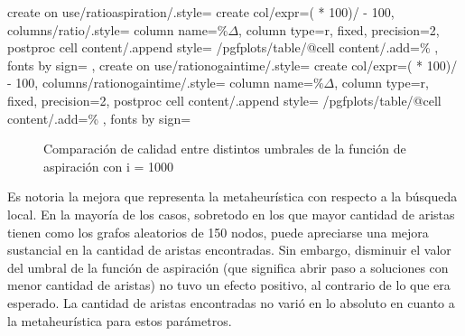 {    %
    create on use/ratioaspiration/.style=
        {create col/expr={( * 100)/  - 100}},
    columns/ratio/.style={
        column name=$\% \Delta$,
        column type={r},
        fixed, precision=2,
        postproc cell content/.append style={
            /pgfplots/table/@cell content/.add={}{\%}
        },
        fonts by sign={}{\color{red}}
    },
    create on use/rationogaintime/.style=
        {create col/expr={( * 100)/  - 100}},
    columns/rationogaintime/.style={
        column name=$\% \Delta$,
        column type={r},
        fixed, precision=2,
        postproc cell content/.append style={
            /pgfplots/table/@cell content/.add={}{\%}
        },
        fonts by sign={}{\color{red}}
    }
}



\begin{figure}[H]
    \centering
    \caption{Comparación de calidad entre distintos umbrales de la función de aspiración con i = 1000}
    \pgfplotstabletypeset[
        columns={0, solutions, localsearch, lowiterationlowaspiration, lowiterationhighaspiration, lowiterationfullaspiration}
    ]{\optimalsolutions}
\end{figure}

Es notoria la mejora que representa la metaheurística con respecto a la búsqueda local. En la mayoría de los casos, sobretodo en los que mayor cantidad de aristas tienen como los grafos aleatorios de 150 nodos, puede apreciarse una mejora sustancial en la cantidad de aristas encontradas. Sin embargo, disminuir el valor del umbral de la función de aspiración (que significa abrir paso a soluciones con menor cantidad de aristas) no tuvo un
efecto positivo, al contrario de lo que era esperado. La cantidad de aristas encontradas no varió en lo absoluto en cuanto a la metaheurística para estos parámetros.

